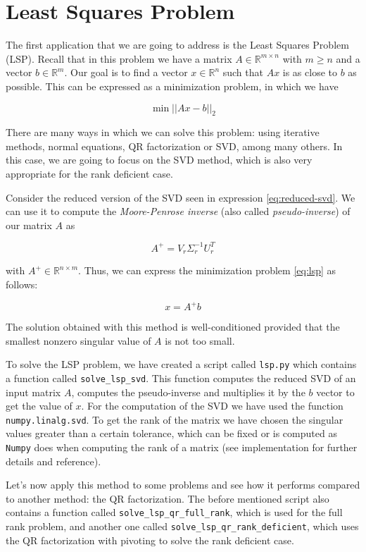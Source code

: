 \documentclass[11pt,a4paper]{article}
\begin{document}
\section{Least Squares Problem}

The first application that we are going to address is the Least Squares Problem (LSP). Recall that
in this problem we have a matrix $A \in \mathbb{R}^{m \times n}$ with $m \geq n$ and a vector
$b \in \mathbb{R}^m$. Our goal is to find a vector $x \in \mathbb{R}^n$ such that $Ax$ is as close
to $b$ as possible. This can be expressed as a minimization problem, in which we have

\begin{equation}
  \label{eq:lsp}
  \min ||Ax-b||_2
\end{equation}

There are many ways in which we can solve this problem: using iterative methods, normal equations,
QR factorization or SVD, among many others. In this case, we are going to focus on the SVD method,
which is also very appropriate for the rank deficient case.

Consider the reduced version of the SVD seen in expression \eqref{eq:reduced-svd}. We can use it to
compute the \emph{Moore-Penrose inverse} (also called \emph{pseudo-inverse}) of our matrix $A$ as

\[
  A^+ = V_r \Sigma_r^{-1} U_r^T
\]

with $A^+ \in \mathbb{R}^{n \times m}$. Thus, we can express the minimization problem \eqref{eq:lsp}
as follows:

\[
  x = A^+ b
\]

The solution obtained with this method is well-conditioned provided that the smallest nonzero
singular value of $A$ is not too small.

To solve the LSP problem, we have created a script called \texttt{lsp.py} which contains a function
called \texttt{solve\_lsp\_svd}. This function computes the reduced SVD of an input matrix $A$,
computes the pseudo-inverse and multiplies it by the $b$ vector to get the value of $x$.
For the computation of the SVD we have used the function \texttt{numpy.linalg.svd}.
To get the rank of the matrix we have chosen the singular values greater than a certain tolerance,
which can be fixed or is computed as \texttt{Numpy} does when computing the rank of a matrix
(see implementation for further details and reference).

Let's now apply this method to some problems and see how it performs compared to another method:
the QR factorization. The before mentioned script also contains a function called
\texttt{solve\_lsp\_qr\_full\_rank}, which is used for the full rank problem, and another
one called \texttt{solve\_lsp\_qr\_rank\_deficient}, which uses the QR factorization with pivoting
to solve the rank deficient case.
\end{document}
